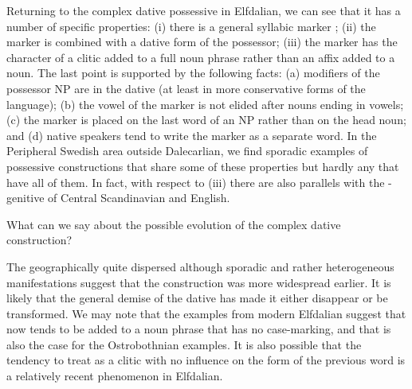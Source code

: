 Returning to the complex dative possessive in Elfdalian, we can see that it has a number of specific properties: (i) there is a general syllabic marker ; (ii) the marker is combined with a dative form of the possessor; (iii) the marker has the character of a clitic added to a full noun phrase rather than an affix added to a noun. The last point is supported by  the following facts: (a) modifiers of the possessor NP are in the dative (at least in more conservative forms of the language); (b) the vowel of the marker is not elided after nouns ending in vowels; (c) the marker is placed on the last word of an NP rather than on the head noun; and (d) native speakers tend to write the marker as a separate word. In the Peripheral Swedish area outside Dalecarlian, we find sporadic examples of possessive constructions that share some of these properties but hardly any that have all of them. In fact, with respect to (iii) there are also parallels with the -genitive of Central Scandinavian and English. 

What can we say about the possible evolution of the complex dative construction? 

The geographically quite dispersed although sporadic and rather heterogeneous manifestations suggest that the construction was more widespread earlier. It is likely that the general demise of the dative has made it either disappear or be transformed. We may note that the examples from modern Elfdalian suggest that now tends to be added to a noun phrase that has no case-marking, and that is also the case for the Ostrobothnian examples. It is also possible that the tendency to treat  as a clitic with no influence on the form of the previous word is a relatively recent phenomenon in Elfdalian.  

